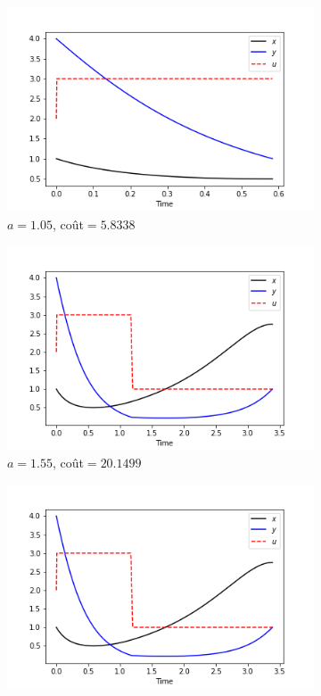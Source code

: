 \documentclass[
	french,
	11pt, %
]{fphw}
\begin{document}
\begin{figure}[H]
    \centering
    \begin{subfigure}[b]{0.32\textwidth}
        \includegraphics[width=\textwidth]{Exo34.png}
        \caption{$a = 1.05$, coût$=5.8338$}
    \end{subfigure}
    \begin{subfigure}[b]{0.32\textwidth}
        \includegraphics[width=\textwidth]{Exo35.png}
        \caption{$a = 1.55$, coût$=20.1499$}
	\end{subfigure}
    \begin{subfigure}[b]{0.32\textwidth}
        \includegraphics[width=\textwidth]{Exo36.png}

\end{subfigure}
\end{figure}
\end{document}
